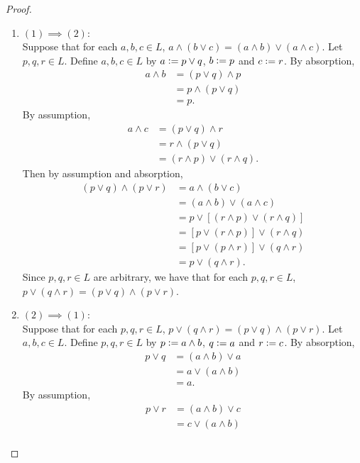\documentclass{book}
\begin{document}
	\begin{proof}\
		\begin{enumerate}
			\item $(1) \implies (2)$: \\
			Suppose that for each $a,b,c \in L$, $a \wedge (b \vee c) = (a \wedge b) \vee (a \wedge c)$. Let $p,q,r \in L$. Define $a,b,c \in L$ by $a \vcentcolon= p \vee q$, $b \vcentcolon= p$ and $c \vcentcolon= r$. By absorption, 
			\begin{align*}
				a \wedge b
				& = (p \vee q) \wedge p \\
				& = p \wedge (p \vee q) \\
				& = p.
			\end{align*}
			By assumption,
			\begin{align*}
				a \wedge c
				& = (p \vee q) \wedge r \\
				& = r \wedge (p \vee q) \\
				& = (r \wedge p) \vee (r \wedge q).
			\end{align*}
			Then by assumption and absorption,
			\begin{align*}
				(p \vee q) \wedge (p \vee r)
				& = a \wedge (b \vee c) \\
				& = (a \wedge b) \vee (a \wedge c) \\
				& = p \vee [(r \wedge p) \vee (r \wedge q)] \\
				& = [p \vee (r \wedge p)] \vee (r \wedge q) \\
				& = [p \vee (p \wedge r)] \vee (q \wedge r) \\
				& = p \vee (q \wedge r).
			\end{align*}
			Since $p,q,r \in L$ are arbitrary, we have that for each $p,q,r \in L$, $p \vee (q \wedge r) = (p \vee q) \wedge (p \vee r)$.
			\item $(2) \implies (1)$: \\
			Suppose that for each $p,q,r \in L$, $p \vee (q \wedge r) = (p \vee q) \wedge (p \vee r)$. Let $a,b,c \in L$. Define $p,q,r \in L$ by $p \vcentcolon= a \wedge b$, $q \vcentcolon= a$ and $r \vcentcolon= c$. 
			By absorption, 
			\begin{align*}
				p \vee q
				& = (a \wedge b) \vee a \\
				& = a \vee (a \wedge b) \\
				& = a.
			\end{align*}
			By assumption,
			\begin{align*}
				p \vee r
				& = (a \wedge b) \vee c \\
				& = c \vee (a \wedge b) \\

\end{align*}
\end{enumerate}
\end{proof}
\end{document}
